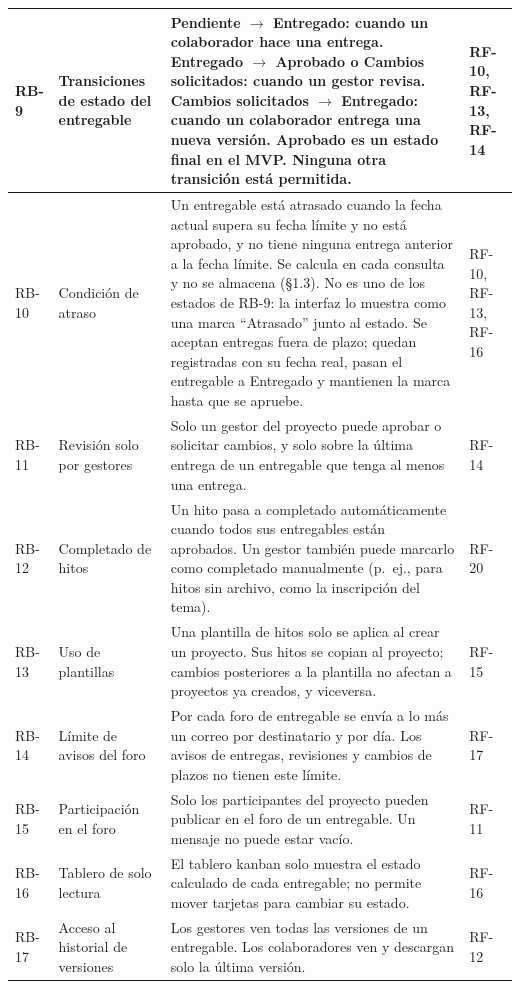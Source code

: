\documentclass[10pt,a4paper]{article}
\begin{document}
\begin{xltabular}{\linewidth}{|P{1.2cm}|P{3.8cm}|L|P{2.6cm}|}
RB-9 & Transiciones de estado del entregable & Pendiente $\rightarrow$ Entregado: cuando un colaborador hace una entrega. Entregado $\rightarrow$ Aprobado o Cambios solicitados: cuando un gestor revisa. Cambios solicitados $\rightarrow$ Entregado: cuando un colaborador entrega una nueva versión. Aprobado es un estado final en el MVP. Ninguna otra transición está permitida. & RF-10, RF-13, RF-14 \\ \hline
RB-10 & Condición de atraso & Un entregable está atrasado cuando la fecha actual supera su fecha límite y no está aprobado, y no tiene ninguna entrega anterior a la fecha límite. Se calcula en cada consulta y no se almacena (§1.3). No es uno de los estados de RB-9: la interfaz lo muestra como una marca ``Atrasado'' junto al estado. Se aceptan entregas fuera de plazo; quedan registradas con su fecha real, pasan el entregable a Entregado y mantienen la marca hasta que se apruebe. & RF-10, RF-13, RF-16 \\ \hline
RB-11 & Revisión solo por gestores & Solo un gestor del proyecto puede aprobar o solicitar cambios, y solo sobre la última entrega de un entregable que tenga al menos una entrega. & RF-14 \\ \hline
RB-12 & Completado de hitos & Un hito pasa a completado automáticamente cuando todos sus entregables están aprobados. Un gestor también puede marcarlo como completado manualmente (p.~ej., para hitos sin archivo, como la inscripción del tema). & RF-20 \\ \hline
RB-13 & Uso de plantillas & Una plantilla de hitos solo se aplica al crear un proyecto. Sus hitos se copian al proyecto; cambios posteriores a la plantilla no afectan a proyectos ya creados, y viceversa. & RF-15 \\ \hline
RB-14 & Límite de avisos del foro & Por cada foro de entregable se envía a lo más un correo por destinatario y por día. Los avisos de entregas, revisiones y cambios de plazos no tienen este límite. & RF-17 \\ \hline
RB-15 & Participación en el foro & Solo los participantes del proyecto pueden publicar en el foro de un entregable. Un mensaje no puede estar vacío. & RF-11 \\ \hline
RB-16 & Tablero de solo lectura & El tablero kanban solo muestra el estado calculado de cada entregable; no permite mover tarjetas para cambiar su estado. & RF-16 \\ \hline
RB-17 & Acceso al historial de versiones & Los gestores ven todas las versiones de un entregable. Los colaboradores ven y descargan solo la última versión. & RF-12 \\ \hline

\end{xltabular}
\end{document}
